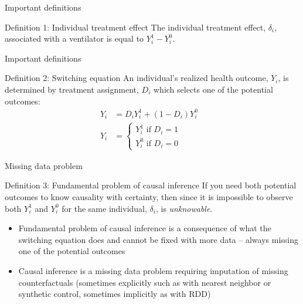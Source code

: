 \documentclass{beamer}
\begin{document}
\begin{frame}{Important definitions}

    \begin{block}{Definition 1: Individual treatment effect}
      The individual treatment effect,  $\delta_i$, associated with a ventilator is equal to $Y_i^1-Y_i^0$.
    \end{block}
\end{frame}


\begin{frame}{Important definitions}


    \begin{block}{Definition 2: Switching equation}
      An individual's realized health outcome, $Y_i$, is determined by treatment assignment, $D_i$ which selects one of the potential outcomes:
      \begin{eqnarray*}
        Y_i& = D_iY^1_i+(1-D_i)Y^0_i& \\
        Y_i& = \begin{cases}
          Y^1_i\text{ if }D_i=1 \\
          Y^0_i\text{ if }D_i=0
        \end{cases}
      \end{eqnarray*}
    \end{block}

\end{frame}


\begin{frame}{Missing data problem}


    \begin{block}{Definition 3: Fundamental problem of causal inference}
      If you need both potential outcomes to know causality with certainty, then since it is impossible to observe both $Y_i^1$ and $Y_i^0$ for the same individual, $\delta_i$, is \emph{unknowable}.
    \end{block}
    
      \begin{itemize}
    \item Fundamental problem of causal inference is a consequence of what the switching equation does and cannot be fixed with more data -- always missing one of the potential outcomes
    \item Causal inference is a missing data problem requiring imputation of missing counterfactuals (sometimes explicitly such as with nearest neighbor or synthetic control, sometimes implicitly as with RDD)
  \end{itemize}

    
\end{frame}
\end{document}

